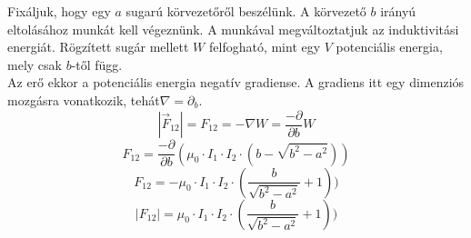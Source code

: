 \documentclass[11pt,a4paper,openany,leqno]{article}
\begin{document}
Fixáljuk, hogy egy $a$ sugarú körvezetőről beszélünk. A körvezető $b$ irányú eltolásához munkát kell végeznünk. A munkával megváltoztatjuk az induktivitási energiát. Rögzített sugár mellett $W$ felfogható, mint egy $V$ potenciális energia, mely csak $b$-től függ. \\ \indent
Az erő ekkor a potenciális energia negatív gradiense. A gradiens itt egy dimenziós mozgásra vonatkozik, tehát$ \nabla = \partial _b$.\\
$$ |\vec{F}_{12}| = F_{12} = -\nabla W = \frac{-\partial }{\partial b}W $$
$$ F_{12} = \frac{-\partial }{\partial b}(\mu_0\cdot I_1 \cdot I_2 \cdot (b-\sqrt{b^2 - a^2})) $$
$$ F_{12} = -\mu_0\cdot I_1 \cdot I_2 \cdot (\frac{b}{\sqrt{b^2 - a^2}}+1)) $$
$$ |F_{12}| = \mu_0\cdot I_1 \cdot I_2 \cdot (\frac{b}{\sqrt{b^2 - a^2}}+1)) $$
\end{document}
